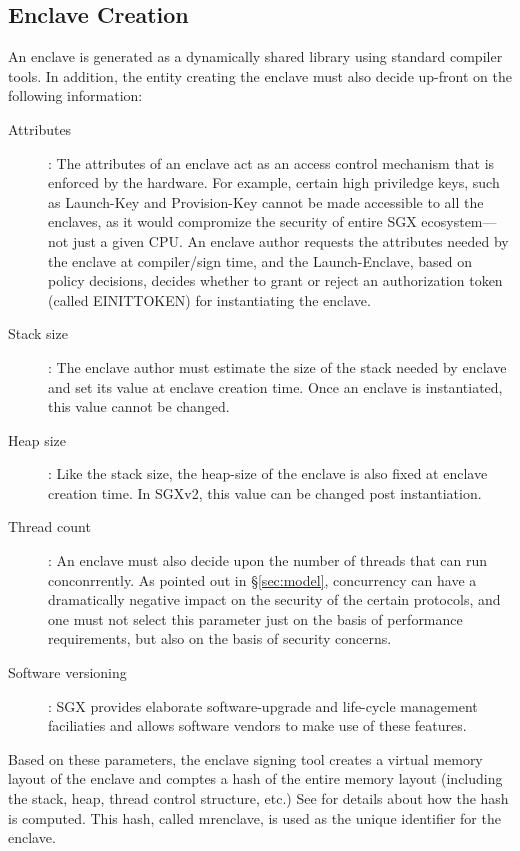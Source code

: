 \documentclass[11pt]{article}
\newcommand{\secref}[1]{\S\ref{#1}}
\newcommand{\mrenclave}{\textsf{mrenclave}}
\begin{document}
  \subsection{Enclave Creation}
  \label{sec:enclavecreateion}
  An enclave is generated as a dynamically shared library using
  standard compiler tools. In addition, the entity creating the
  enclave must also decide up-front on the following information:

  \begin{description}
    \item[Attributes]: The attributes of an enclave act as an access
      control mechanism that is enforced by the hardware. For example,
      certain high priviledge keys, such as Launch-Key and Provision-Key 
      cannot be made accessible to all the enclaves, as it would 
      compromize the security of entire SGX ecosystem---not just a 
      given CPU. An enclave author requests the attributes needed by 
      the enclave at compiler/sign time, and the Launch-Enclave, based 
      on policy decisions, decides whether to grant or reject an 
      authorization token (called \textsf{EINITTOKEN}) for instantiating 
      the enclave.
    \item[Stack size]: The enclave author must estimate the size of the
      stack needed by enclave and set its value at enclave creation time. 
      Once an enclave is instantiated, this value cannot be changed.

    \item[Heap size]: Like the stack size, the heap-size of the enclave 
      is also fixed at enclave creation time. In SGXv2, this value can 
      be changed post instantiation.

    \item[Thread count]: An enclave must also decide upon the number
      of threads that can run conconrrently. As pointed out in
      \secref{sec:model}, concurrency can have a dramatically negative
      impact on the security of the certain protocols, and one must
      not select this parameter just on the basis of performance 
      requirements, but also on the basis of security concerns.
    
    \item[Software versioning]: SGX provides elaborate software-upgrade 
      and life-cycle management faciliaties and allows software vendors 
      to make use of these features.

  \end{description}
  Based on these parameters, the enclave signing tool creates a
  virtual memory layout of the enclave and comptes a hash of the
  entire memory layout (including the stack, heap, thread control
  structure, etc.)  See \cite{intelsdm} for details
  about how the hash is computed. This hash, called
  \mrenclave, is used as the unique identifier for the enclave.
\end{document}
